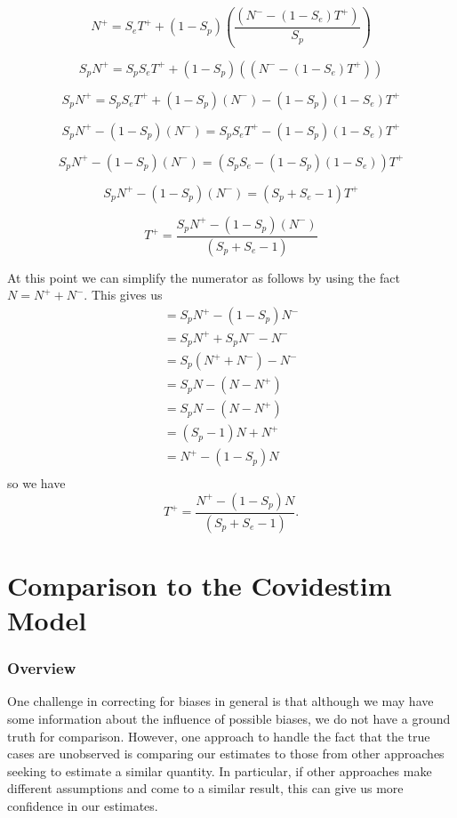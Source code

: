 \documentclass[12pt,twoside]{smiththesis}
\begin{document}
\[
 N^+ =S_e T^+ + (1-S_p)  \left( \dfrac{( N^- - (1-S_e) T^+) }{S_p} \right)
\]

\[
 S_pN^+ =S_pS_e T^+ + (1-S_p)  \left( {( N^- - (1-S_e) T^+) } \right)
\]

\[
 S_pN^+ =S_pS_e T^+ + (1-S_p)  ( N^-)  - (1-S_p)(1-S_e) T^+
\]

\[
 S_pN^+ -   (1-S_p)  ( N^-) =S_pS_e T^+  - (1-S_p)(1-S_e) T^+
\]

\[
 S_pN^+ -   (1-S_p)  ( N^-) = (S_pS_e  - (1-S_p)(1-S_e)) T^+
\]

\[
 S_pN^+ -   (1-S_p)  ( N^-) = (S_p + S_e - 1) T^+
\]

\[
 T^+ = \dfrac{ S_pN^+ -   (1-S_p)  ( N^-)}{(S_p + S_e - 1)} 
\]

At this point we can simplify the numerator as follows by using the fact \(N = N^+ + N^-\). This gives us
\begin{align*} =S_pN^+ -   (1-S_p)  N^-\\
=  S_pN^+ + S_p  N^- - N^-\\
=  S_p(N^+ +  N^-) - N^- \\
=  S_pN - (N-N^+) \\
=  S_pN - (N-N^+) \\
=  (S_p-1)N + N^+ \\
=    N^+ - (1-S_p)N\\
\end{align*}
so we have
\[
 T^+ = \dfrac{  N^+ - (1-S_p)N}{(S_p + S_e - 1)}.
\]

\hypertarget{comparison-to-the-covidestim-model}{%
\chapter{Comparison to the Covidestim Model}\label{comparison-to-the-covidestim-model}}

\hypertarget{overview}{%
\subsection{Overview}\label{overview}}

One challenge in correcting for biases in general is that although we may have some information about the influence of possible biases, we do not have a ground truth for comparison. However, one approach to handle the fact that the true cases are unobserved is comparing our estimates to those from other approaches seeking to estimate a similar quantity. In particular, if other approaches make different assumptions and come to a similar result, this can give us more confidence in our estimates.
\end{document}
